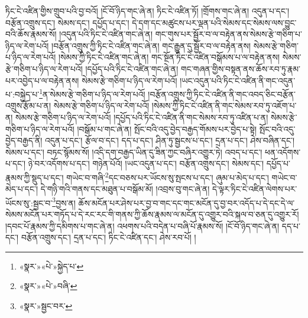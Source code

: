 ཏིང་ངེ་འཛིན་གྱིས་གྲུབ་པའི་བྱ་བའོ། །ངོ་བོ་ཉིད་གང་ཞེ་ན། ཏིང་ངེ་འཛིན་ཏོ། །གྲོགས་གང་ཞེ་ན། འདུན་པ་དང་། བརྩོན་འགྲུས་དང་། སེམས་དང་། དཔྱོད་པ་དང་། དེ་དག་དང་མཚུངས་པར་ལྡན་པའི་སེམས་དང་སེམས་ལས་བྱུང་བའི་ཆོས་རྣམས་སོ། །འདུན་པའི་ཏིང་ངེ་འཛིན་གང་ཞེ་ན། གང་གུས་པར་སྦྱོར་བ་ལ་བརྟེན་ནས་སེམས་རྩེ་གཅིག་པ་ཉིད་ལ་རེག་པའོ། །བརྩོན་འགྲུས་ཀྱི་ཏིང་ངེ་འཛིན་གང་ཞེ་ན། གང་རྒྱུན་དུ་སྦྱོར་བ་ལ་བརྟེན་ནས། སེམས་རྩེ་གཅིག་པ་ཉིད་ལ་རེག་པའོ། །སེམས་ཀྱི་ཏིང་ངེ་འཛིན་གང་ཞེ་ན། གང་སྔོན་ཏིང་ངེ་འཛིན་བསྒོམས་པ་ལ་བརྟེན་ནས། སེམས་རྩེ་གཅིག་པ་ཉིད་ལ་རེག་པའོ། །དཔྱོད་པའི་ཏིང་ངེ་འཛིན་གང་ཞེ་ན། གང་གཞན་གྱིས་བསྟན་ནས་ཆོས་རབ་ཏུ་རྣམ་པར་འབྱེད་པ་ལ་བརྟེན་ནས། སེམས་རྩེ་གཅིག་པ་ཉིད་ལ་རེག་པའོ། །ཡང་འདུན་པའི་ཏིང་ངེ་འཛིན་ནི་གང་འདུན་པ་:བསྐྱེད་པ་\footnote{«སྣར་»«པེ་»སྐྱེད་པ་}ན་སེམས་རྩེ་གཅིག་པ་ཉིད་ལ་རེག་པའོ། །བརྩོན་འགྲུས་ཀྱི་ཏིང་ངེ་འཛིན་ནི་གང་འབད་ཅིང་བརྩོན་འགྲུས་རྩོམ་པ་ན། སེམས་རྩེ་གཅིག་པ་ཉིད་ལ་རེག་པའོ། །སེམས་ཀྱི་ཏིང་ངེ་འཛིན་ནི་གང་སེམས་རབ་ཏུ་འཇོག་པ་ན། སེམས་རྩེ་གཅིག་པ་ཉིད་ལ་རེག་པའོ། །དཔྱོད་པའི་ཏིང་ངེ་འཛིན་ནི་གང་སེམས་རབ་ཏུ་འཛིན་པ་ན། སེམས་རྩེ་གཅིག་པ་ཉིད་ལ་རེག་པའོ། །བསྒོམ་པ་གང་ཞེ་ན། སྤོང་བའི་འདུ་བྱེད་བརྒྱད་གོམས་པར་བྱེད་པ་སྟེ། སྤོང་བའི་འདུ་བྱེད་བརྒྱད་ནི། འདུན་པ་དང་། རྩོལ་བ་དང་། དད་པ་དང་། ཤིན་ཏུ་སྦྱངས་པ་དང་། དྲན་པ་དང་། ཤེས་བཞིན་དང་། སེམས་པ་དང་། བཏང་སྙོམས་སོ། །འདི་དག་བརྒྱད་ཡིན་དུ་ཟིན་ཀྱང་བཞིར་འགྱུར་ཏེ། འབད་པ་དང་། ཕན་འདོགས་པ་དང་། ཉེ་བར་འདོགས་པ་དང་། གཉེན་པོའོ། །ཡང་འདུན་པ་དང་། བརྩོན་འགྲུས་དང་། སེམས་དང་། དཔྱོད་པ་རྣམས་ཀྱི་སྡུད་པ་དང་། གཡེང་བ་གཞི་\footnote{«སྣར་»«པེ་»བཞི་}དང་བཅས་པར་ཡོངས་སུ་སྤངས་པ་དང་། ཞུམ་པ་མེད་པ་དང་། གཡེང་བ་མེད་པ་དང་། དེ་གཉི་གའི་གནས་དང་མཐུན་པ་བསྒོམ་མོ། །འབྲས་བུ་གང་ཞེ་ན། དེ་ལྟར་ཏིང་ངེ་འཛིན་ལེགས་པར་ཡོངས་སུ་:སྦྱང་བ་\footnote{«སྣར་»སྦྱང་བར་}བྱས་ན། ཆོས་མངོན་པར་ཤེས་པར་བྱ་བ་གང་དང་གང་མངོན་དུ་བྱ་བར་འདོད་པ་དེ་དང་དེ་ལ་སེམས་མངོན་པར་གཏོད་པ་དེ་རང་རང་གི་གནས་ཀྱི་ཆོས་རྣམས་ལ་མངོན་དུ་འགྱུར་བའི་སྐལ་བ་ཅན་དུ་འགྱུར་རོ། །དབང་པོ་རྣམས་ཀྱི་དམིགས་པ་གང་ཞེ་ན། འཕགས་པའི་བདེན་པ་བཞི་པོ་རྣམས་སོ། །ངོ་བོ་ཉིད་གང་ཞེ་ན། དད་པ་དང་། བརྩོན་འགྲུས་དང་། དྲན་པ་དང་། ཏིང་ངེ་འཛིན་དང་། ཤེས་རབ་པོ། །
